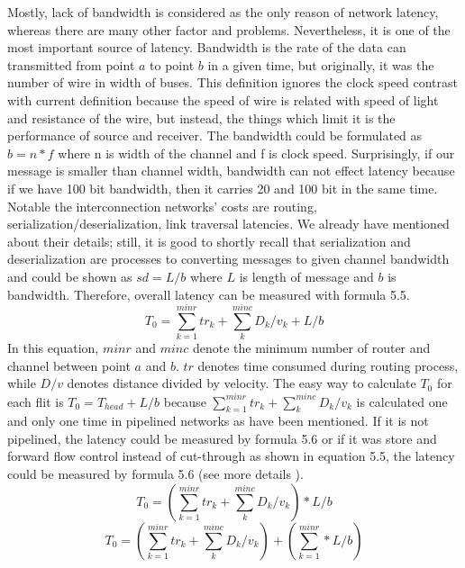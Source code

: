  Mostly, lack of bandwidth is considered as the only reason of network latency, whereas there are many other factor and problems. Nevertheless, it is one of the most important source of latency. Bandwidth is the rate of the data can transmitted from point $a$ to point $b$ in a given time, but originally, it was the number of wire in width of buses. This definition ignores the clock speed contrast with current definition because the speed of wire is related with speed of light and resistance of the wire, but instead, the things which limit it is the performance of source and receiver. The bandwidth could be formulated as $ b = n * f$ where n is width of the channel and f is clock speed. Surprisingly, if our message is smaller than channel width, bandwidth can not effect latency because if we have 100 bit bandwidth, then it carries 20 and 100 bit in the same time. Notable the interconnection networks' costs are routing, serialization/deserialization, link traversal latencies\cite{0122007514}. We already have mentioned about their details; still, it is good to shortly recall that serialization and deserialization are processes to converting messages to given channel bandwidth and could be shown as $ sd = L / b $ where $L$ is length of message and $b$ is bandwidth. Therefore, overall latency can be measured with formula 5.5.
\begin{equation}
T_{0}=\sum_{k=1}^{minr}tr_{k}+\sum_{k}^{minc}D_{k}/v_{k}+L/b
\end{equation}
In this equation, $minr$ and $minc$ denote the minimum number of router and channel between point $a$ and $b$. $tr$ denotes time consumed during routing process, while $D/v$ denotes distance divided by velocity. The easy way to calculate $T_{0}$ for each flit is $T_{0} = T_{head} + L/b$ because $\sum_{k=1}^{minr}tr_{k}+\sum_{k}^{minc}D_{k}/v_{k}$ is calculated one and only one time in pipelined networks as have been mentioned. If it is not pipelined, the latency could be measured by formula 5.6 or if it was store and forward flow control instead of cut-through as shown in equation 5.5, the latency could be measured by formula 5.6 (see more details \cite{0122007514}). 
\begin{equation}
T_{0}=(\sum_{k=1}^{minr}tr_{k}+\sum_{k}^{minc}D_{k}/v_{k})*L/b
\end{equation}
\begin{equation}
T_{0}=(\sum_{k=1}^{minr}tr_{k}+\sum_{k}^{minc}D_{k}/v_{k})+(\sum_{k=1}^{minr}*L/b)
\end{equation}
